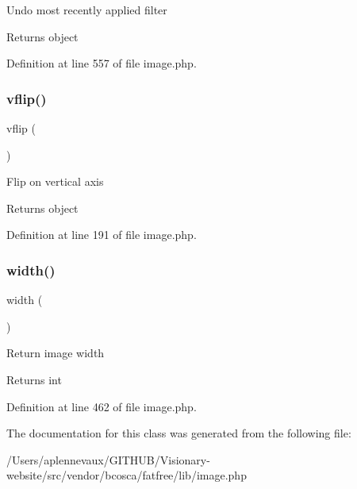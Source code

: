 Undo most recently applied filter \begin{DoxyReturn}{Returns}
object 
\end{DoxyReturn}


Definition at line 557 of file image.\+php.

\hypertarget{class_image_ac7bff34c7bb8af86f020474c2f4f2737}{}\label{class_image_ac7bff34c7bb8af86f020474c2f4f2737} 
\subsubsection{\texorpdfstring{vflip()}{vflip()}}
{\footnotesize\ttfamily vflip (\begin{DoxyParamCaption}{ }\end{DoxyParamCaption})}

Flip on vertical axis \begin{DoxyReturn}{Returns}
object 
\end{DoxyReturn}


Definition at line 191 of file image.\+php.

\hypertarget{class_image_aac6ce1a0981556eb27334db76b666350}{}\label{class_image_aac6ce1a0981556eb27334db76b666350} 
\subsubsection{\texorpdfstring{width()}{width()}}
{\footnotesize\ttfamily width (\begin{DoxyParamCaption}{ }\end{DoxyParamCaption})}

Return image width \begin{DoxyReturn}{Returns}
int 
\end{DoxyReturn}


Definition at line 462 of file image.\+php.



The documentation for this class was generated from the following file\+:\begin{DoxyCompactItemize}
\item 
/\+Users/aplennevaux/\+G\+I\+T\+H\+U\+B/\+Visionary-\/website/src/vendor/bcosca/fatfree/lib/image.\+php\end{DoxyCompactItemize}
